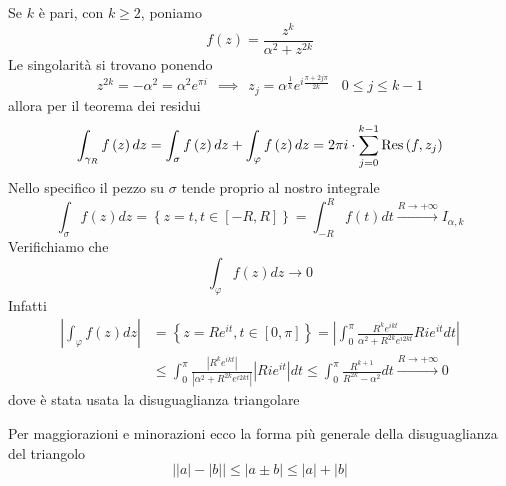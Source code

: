 Se $k$ è pari, con $k\geq 2$, poniamo
\begin{equation*}
f\left(z\right) = \frac{z^{k}}{\alpha ^{2} + z^{2k}}
\end{equation*}
Le singolarità si trovano ponendo
\begin{equation*}
z^{2k} = - \alpha ^{2} = \alpha ^{2} e^{\pi i} \ \ \implies \ \ z_{j} = \alpha ^{\frac{1}{k}} e^{i\frac{\pi + 2j\pi }{2k}} \ \ \ \ 0\leq j\leq k - 1
\end{equation*}
allora per il teorema dei residui
\begin{equation*}
\int _{\gamma _{R}} f\left(z\right) dz = \int _{\sigma } f\left(z\right) dz + \int _{\varphi } f\left(z\right) dz = 2\pi i\cdot \sum\limits ^{k - 1}_{j = 0}\operatorname{Res} \left(f,z_{j}\right)
\end{equation*}
Nello specifico il pezzo su $\sigma $ tende proprio al nostro integrale
\begin{equation*}
\int _{\sigma } f\left(z\right) dz = \left\{z = t,t\in \left[ - R,R\right]\right\} = \int ^{R}_{ - R} f\left(t\right) dt\xrightarrow{R\rightarrow + \infty } I_{\alpha ,k}
\end{equation*}
Verifichiamo che
\begin{equation*}
\int _{\varphi } f\left(z\right) dz\rightarrow 0
\end{equation*}
Infatti
\begin{align*}
\left| \int _{\varphi } f\left(z\right) dz\right|  & = \left\{z = Re^{it} ,t\in \left[ 0,\pi \right]\right\} = \left| \int ^{\pi }_{0}\frac{R^{k} e^{ikt}}{\alpha ^{2} + R^{2k} e^{i2kt}} Rie^{it} dt\right| \\
 & \leq \int ^{\pi }_{0}\frac{\left| R^{k} e^{ikt}\right| }{\left| \alpha ^{2} + R^{2k} e^{i2kt}\right| }\left| Rie^{it}\right| dt\leq \int ^{\pi }_{0}\frac{R^{k + 1}}{R^{2k} - \alpha ^{2}} dt\xrightarrow{R\rightarrow + \infty } 0
\end{align*}
dove è stata usata la disuguaglianza triangolare
\begin{rem}
 Per maggiorazioni e minorazioni ecco la forma più generale della disuguaglianza del triangolo
\begin{equation*}
\left| \left| a\right| - \left| b\right| \right| \leq \left| a\pm b\right| \leq \left| a\right| + \left| b\right| 
\end{equation*}
\end{rem}

